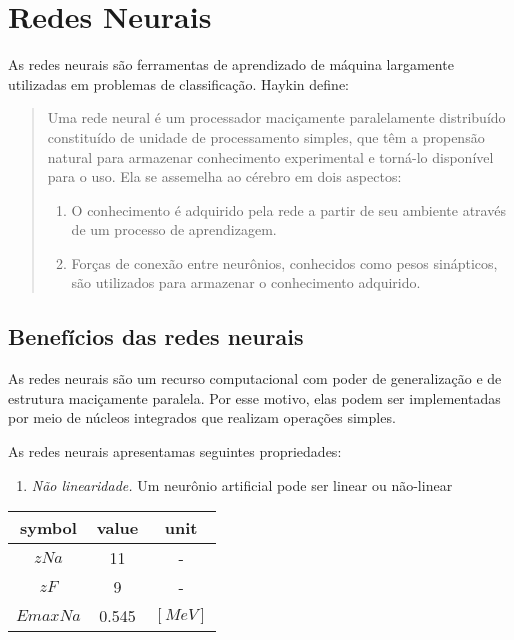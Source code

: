 \section{Redes Neurais}

As redes neurais são ferramentas de aprendizado de máquina largamente utilizadas em  problemas de classificação. Haykin \cite{haykin2009neural} define:
\begin{quote}
Uma rede neural é um processador maciçamente paralelamente distribuído constituído de unidade de processamento simples, que têm a propensão natural para armazenar conhecimento experimental e torná-lo disponível para o uso. Ela se assemelha ao cérebro em dois aspectos:

\begin{enumerate}
\item O conhecimento é adquirido pela rede a partir de seu ambiente através de um processo de aprendizagem.
\item Forças de conexão entre neurônios, conhecidos como pesos sinápticos, são utilizados para armazenar o conhecimento adquirido.
\end{enumerate}

\end{quote}

\subsection{Benefícios das redes neurais}

As redes neurais são um recurso computacional com poder de generalização e de estrutura maciçamente paralela. Por esse motivo, elas podem ser implementadas por meio de núcleos integrados que realizam operações simples. 

As redes neurais apresentamas seguintes propriedades\cite{haykin2009neural}:

\begin{enumerate}
\item \emph{Não linearidade.} Um neurônio artificial pode ser linear ou não-linear
\end{enumerate}

\begin{center}
\begin{tabular}{ | c | c | c | }
  \hline
  symbol & value & unit \\ \hline            
  $z Na$ & 11 & - \\ \hline      
  $z F$ & 9 & - \\ \hline      
  $Emax Na$ & 0.545 & $[MeV]$ \\ \hline
\end{tabular}
\end{center}